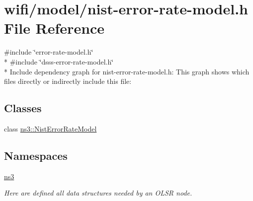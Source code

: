 \hypertarget{nist-error-rate-model_8h}{}\section{wifi/model/nist-\/error-\/rate-\/model.h File Reference}
\label{nist-error-rate-model_8h}
{\ttfamily \#include \char`\"{}error-\/rate-\/model.\+h\char`\"{}}\\*
{\ttfamily \#include \char`\"{}dsss-\/error-\/rate-\/model.\+h\char`\"{}}\\*
Include dependency graph for nist-\/error-\/rate-\/model.h\+:
This graph shows which files directly or indirectly include this file\+:
\subsection*{Classes}
\begin{DoxyCompactItemize}
\item 
class \hyperlink{classns3_1_1NistErrorRateModel}{ns3\+::\+Nist\+Error\+Rate\+Model}
\end{DoxyCompactItemize}
\subsection*{Namespaces}
\begin{DoxyCompactItemize}
\item 
 \hyperlink{namespacens3}{ns3}
\begin{DoxyCompactList}\small\item\em Here are defined all data structures needed by an O\+L\+SR node. \end{DoxyCompactList}\end{DoxyCompactItemize}
